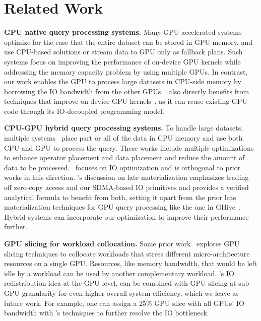 \section{Related Work} \label{section:related_works}

\textbf{GPU native query processing systems.}
Many GPU-accelerated systems~\cite{heavyai, mg-join-sigmod-2021, multi-gpu-sort-sigmod-2022} optimize for the case that the entire dataset can be stored in GPU memory, and use CPU-based solutions or stream data to GPU only as fallback plans. 
Such systems focus on improving the performance of on-device GPU kernels while addressing the memory capacity problem by using multiple GPUs.
In contrast, our work enables the GPU to process large datasets in CPU-side memory by borrowing the IO bandwidth from the other GPUs.
\THISWORK\ also directly benefits from techniques that improve on-device GPU kernels~\cite{Funke-sigmod18, crystal-sigmod-20}, as it can reuse existing GPU code through its IO-decoupled programming model.



\noindent
\textbf{CPU-GPU hybrid query processing systems.}
To handle large datasets, multiple systems~\cite{hetexchange-vldb-2019, HERO-VLDB-2017, GDB-TDBSys-2009, mordered-vldb-2022, Ocelot-VLDB-2014, Ocelet-VLDB-2013, GPUQP, FlinkCL} place part or all of the data in CPU memory and use both CPU and GPU to process the query. 
These works include multiple optimizations to enhance operator placement and data placement and reduce the amount of data to be processed.
\THISWORK\ focuses on IO optimization and is orthogonal to prior works in this direction.
\THISWORK's discussion on late materialization emphasizes trading off zero-copy access and our SDMA-based IO primitives and provides a verified analytical formula to benefit from both, setting it apart from the prior late materialization techniques for GPU query processing like the one in GHive~\cite{GHive}.
Hybrid systems can incorporate our optimization to improve their performance further.

\noindent
\textbf{GPU slicing for workload collocation.}
Some prior work~\cite{robroek2024euromlsys, cao2024vldb} explores GPU slicing techniques to collocate workloads that stress different micro-architecture resources on a single GPU.
Resources, like memory bandwidth, that would be left idle by a workload can be used by another complementary workload. 
\THISWORK's IO redistribution idea at the GPU level, can be combined with GPU slicing at sub-GPU granularity for even higher overall system efficiency, which we leave as future work.
For example, one can assign a 25\% GPU slice with all GPUs' IO bandwidth with \THISWORK's techniques to further resolve the IO bottleneck.



